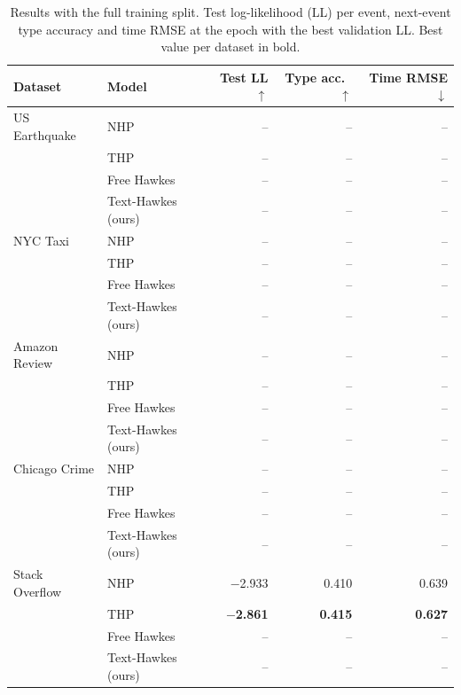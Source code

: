 \begin{table}[t]
\centering
\caption{Results with the full training split. Test log-likelihood (LL) per event, next-event type accuracy and time RMSE at the epoch with the best validation LL. Best value per dataset in bold.}
\label{tab:full}
\small
\begin{tabular}{llrrr}
\toprule
Dataset & Model & Test LL $\uparrow$ & Type acc.\ $\uparrow$ & Time RMSE $\downarrow$ \\
\midrule
US Earthquake & NHP & -- & -- & -- \\
 & THP & -- & -- & -- \\
 & Free Hawkes & -- & -- & -- \\
 & Text-Hawkes (ours) & -- & -- & -- \\
\midrule
NYC Taxi & NHP & -- & -- & -- \\
 & THP & -- & -- & -- \\
 & Free Hawkes & -- & -- & -- \\
 & Text-Hawkes (ours) & -- & -- & -- \\
\midrule
Amazon Review & NHP & -- & -- & -- \\
 & THP & -- & -- & -- \\
 & Free Hawkes & -- & -- & -- \\
 & Text-Hawkes (ours) & -- & -- & -- \\
\midrule
Chicago Crime & NHP & -- & -- & -- \\
 & THP & -- & -- & -- \\
 & Free Hawkes & -- & -- & -- \\
 & Text-Hawkes (ours) & -- & -- & -- \\
\midrule
Stack Overflow & NHP & $-$2.933 & 0.410 & 0.639 \\
 & THP & \textbf{$-$2.861} & \textbf{0.415} & \textbf{0.627} \\
 & Free Hawkes & -- & -- & -- \\
 & Text-Hawkes (ours) & -- & -- & -- \\
\bottomrule
\end{tabular}
\end{table}